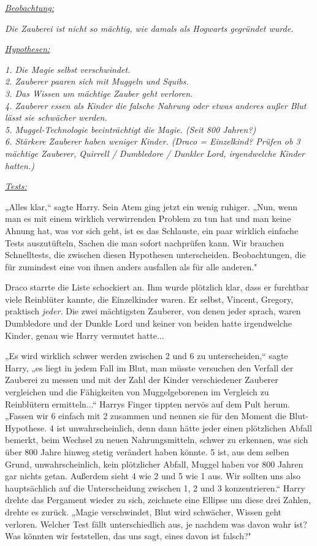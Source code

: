 {\emph{\uline{Beobachtung:}}

\emph{Die Zauberei ist nicht so mächtig, wie damals als Hogwarts gegründet wurde.}

\emph{\uline{Hypothesen:}}

\emph{\emph{1. Die Magie selbst verschwindet.\\ 2. Zauberer paaren sich mit Muggeln und Squibs.\\ 3. Das Wissen um mächtige Zauber geht verloren.\\ 4. Zauberer essen als Kinder die falsche Nahrung oder etwas anderes außer Blut lässt sie schwächer werden.\\ 5. Muggel-Technologie beeinträchtigt die Magie. (Seit 800 Jahren?)\\ 6. Stärkere Zauberer haben weniger Kinder. (Draco = Einzelkind? Prüfen ob 3 mächtige Zauberer, Quirrell / Dumbledore / Dunkler Lord, irgendwelche Kinder hatten.)}}

\emph{\uline{Tests:}}

„Alles klar,“ sagte Harry. Sein Atem ging jetzt ein wenig ruhiger. „Nun, wenn man es mit einem wirklich verwirrenden Problem zu tun hat und man keine Ahnung hat, was vor sich geht, ist es das Schlauste, ein paar wirklich einfache Tests auszutüfteln, Sachen die man sofort nachprüfen kann. Wir brauchen Schnelltests, die zwischen diesen Hypothesen unterscheiden. Beobachtungen, die für zumindest eine von ihnen anders ausfallen als für alle anderen."

Draco starrte die Liste schockiert an. Ihm wurde plötzlich klar, dass er furchtbar viele Reinblüter kannte, die Einzelkinder waren. Er selbst, Vincent, Gregory, praktisch \emph{jeder.} Die zwei mächtigsten Zauberer, von denen jeder sprach, waren Dumbledore und der Dunkle Lord und keiner von beiden hatte irgendwelche Kinder, genau wie Harry vermutet hatte...

„Es wird wirklich schwer werden zwischen 2 und 6 zu unterscheiden,“ sagte Harry, „es liegt in jedem Fall im Blut, man müsste versuchen den Verfall der Zauberei zu messen und mit der Zahl der Kinder verschiedener Zauberer vergleichen und die Fähigkeiten von Muggelgeborenen im Vergleich zu Reinblütern ermitteln...“ Harrys Finger tippten nervös auf dem Pult herum. „Fassen wir 6 einfach mit 2 zusammen und nennen sie für den Moment die Blut-Hypothese. 4 ist unwahrscheinlich, denn dann hätte jeder einen plötzlichen Abfall bemerkt, beim Wechsel zu neuen Nahrungsmitteln, schwer zu erkennen, was sich über 800 Jahre hinweg stetig verändert haben könnte. 5 ist, aus dem selben Grund, unwahrscheinlich, kein plötzlicher Abfall, Muggel haben vor 800 Jahren gar nichts getan. Außerdem sieht 4 wie 2 und 5 wie 1 aus. Wir sollten uns also hauptsächlich auf die Unterscheidung zwischen 1, 2 und 3 konzentrieren.“ Harry drehte das Pergament wieder zu sich, zeichnete eine Ellipse um diese drei Zahlen, drehte es zurück. „Magie verschwindet, Blut wird schwächer, Wissen geht verloren. Welcher Test fällt unterschiedlich aus, je nachdem was davon wahr ist? Was könnten wir feststellen, das uns sagt, eines davon ist falsch?"

}
